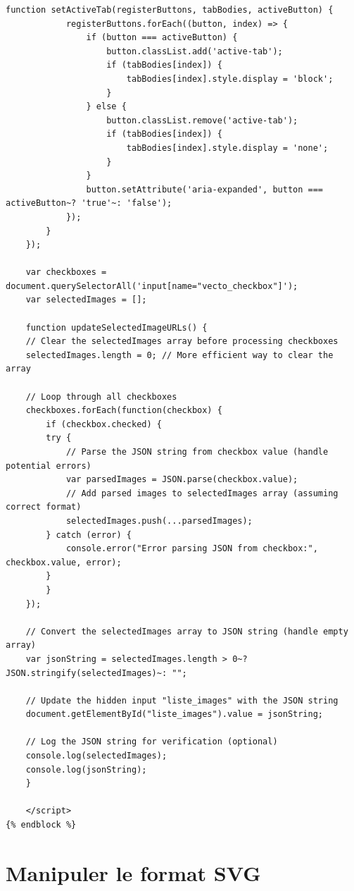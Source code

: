 \begin{lstlisting}[language=HTML5, frame=single, breaklines=true, caption={Template \html pour afficher les extractions et leurs vectorisations.}]
        function setActiveTab(registerButtons, tabBodies, activeButton) {
            registerButtons.forEach((button, index) => {
                if (button === activeButton) {
                    button.classList.add('active-tab');
                    if (tabBodies[index]) {
                        tabBodies[index].style.display = 'block';
                    }
                } else {
                    button.classList.remove('active-tab');
                    if (tabBodies[index]) {
                        tabBodies[index].style.display = 'none';
                    }
                }
                button.setAttribute('aria-expanded', button === activeButton~? 'true'~: 'false');
            });
        }
    });

    var checkboxes = document.querySelectorAll('input[name="vecto_checkbox"]');
    var selectedImages = [];

    function updateSelectedImageURLs() {
    // Clear the selectedImages array before processing checkboxes
    selectedImages.length = 0; // More efficient way to clear the array

    // Loop through all checkboxes
    checkboxes.forEach(function(checkbox) {
        if (checkbox.checked) {
        try {
            // Parse the JSON string from checkbox value (handle potential errors)
            var parsedImages = JSON.parse(checkbox.value);
            // Add parsed images to selectedImages array (assuming correct format)
            selectedImages.push(...parsedImages);
        } catch (error) {
            console.error("Error parsing JSON from checkbox:", checkbox.value, error);
        }
        }
    });

    // Convert the selectedImages array to JSON string (handle empty array)
    var jsonString = selectedImages.length > 0~? JSON.stringify(selectedImages)~: "";

    // Update the hidden input "liste_images" with the JSON string
    document.getElementById("liste_images").value = jsonString;

    // Log the JSON string for verification (optional)
    console.log(selectedImages);
    console.log(jsonString);
    }

    </script>
{% endblock %}

\end{lstlisting}

\section{Manipuler le format SVG}

